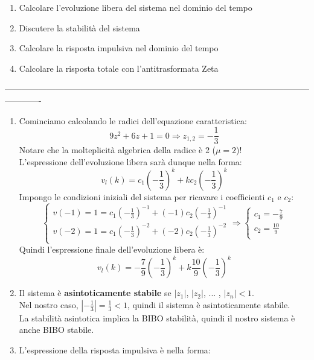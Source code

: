 \documentclass[12pt,a4paper]{article}
\begin{document}
	\begin{enumerate}
		\item Calcolare l'evoluzione libera del sistema nel dominio del tempo
		\item Discutere la stabilit\`a del sistema
		\item Calcolare la risposta impulsiva nel dominio del tempo
		\item Calcolare la risposta totale con l'antitrasformata Zeta

	\end{enumerate}
	-------------------------------------------------------------------------------------------------------------------------\\
	\begin{enumerate}
		\item Cominciamo calcolando le radici dell'equazione caratteristica:
		\[
			9z^2 + 6z + 1 = 0
			\Rightarrow
			z_{1,2} = -\frac{1}{3}
		\]
		Notare che la molteplicit\`a algebrica della radice è 2 ($\mu = 2$)! \\
		L'espressione dell'evoluzione libera sar\`a dunque nella forma:
		\[
			v_l(k) = c_1\left(-\frac{1}{3}\right)^k + kc_2\left(-\frac{1}{3}\right)^k
		\]
		Impongo le condizioni iniziali del sistema per ricavare i coefficienti $c_1$ e $c_2$:
		\[
			\begin{cases}
				v(-1) = 1 = c_1\left(-\frac{1}{3}\right)^{-1} + (-1)c_2\left(-\frac{1}{3}\right)^{-1} \\
				v(-2) = 1 = c_1\left(-\frac{1}{3}\right)^{-2} + (-2)c_2\left(-\frac{1}{3}\right)^{-2} \\
			\end{cases}
			\Rightarrow
			\begin{cases}
				c_1 = -\frac{7}{9}\\
				c_2 = \frac{10}{9}\\
			\end{cases}
		\]
		Quindi l'espressione finale dell'evoluzione libera \`e:
		\[
			v_l(k) = -\frac{7}{9}\left(-\frac{1}{3}\right)^k + k\frac{10}{9}\left(-\frac{1}{3}\right)^k
		\]
		\item Il sistema è \textbf{asintoticamente stabile} se $|z_1|$, $|z_2|$, ... , $|z_n| < 1$. \\
		Nel nostro caso, $|-\frac{1}{3}| = \frac{1}{3} < 1$, quindi il sistema è asintoticamente stabile.\\
		La stabilit\`a asintotica implica la BIBO stabilit\`a, quindi il nostro sistema \`e anche BIBO stabile.
		\item L'espressione della risposta impulsiva \`e nella forma:

\end{enumerate}
\end{document}
